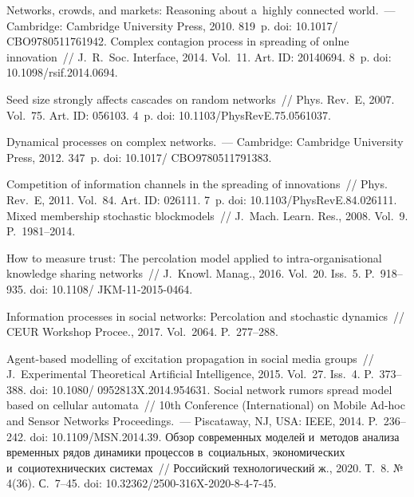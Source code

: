 \begin{multicols}{2}
{\small\frenchspacing
{%
\begin{thebibliography}{99}
 Networks, crowds, and markets: Reasoning about a~highly connected 
world.~--- Cambridge: Cambridge University Press, 2010. 819~p. 
doi:  10.1017/ CBO9780511761942.
 Complex contagion process in spreading of 
onlne innovation~// J.~R.~Soc. Interface, 2014. Vol.~11. Art. ID: 20140694. 8~p. doi: 
10.1098/rsif.2014.0694.

 Seed size strongly affects cascades on random networks~// 
Phys. Rev.~E, 2007. Vol.~75. Art. ID: 056103. 4~p. doi: 10.1103/PhysRevE.75.0561037.

 Dynamical processes on complex networks.~--- 
Cambridge: Cambridge University Press, 2012. 347~p. doi: 10.1017/ CBO9780511791383.

 Competition of information channels in the spreading of innovations~// 
Phys. Rev.~E, 2011. Vol.~84. Art. ID: 026111. 7~p. doi: 10.1103/PhysRevE.84.026111.
 Mixed membership stochastic 
blockmodels~// J.~Mach. Learn. Res., 2008. Vol.~9. P.~1981--2014.


 How to measure trust: The percolation model 
applied to intra-organisational knowledge sharing networks~// J.~Knowl. Manag., 2016. Vol.~20. 
Iss.~5. P.~918--935. doi: 10.1108/ JKM-11-2015-0464.

 Information processes in social networks: 
Percolation and stochastic dynamics~// CEUR Workshop Procee., 2017. Vol.~2064. 
P.~277--288.

 Agent-based modelling of excitation propagation in social 
media groups~// J.~Experimental Theoretical Artificial Intelligence, 2015. Vol.~27. Iss.~4.  
P.~373--388. doi: 10.1080/ 0952813X.2014.954631.
 Social network rumors spread model based on cellular automata~// 
10th Conference (International) on Mobile Ad-hoc and Sensor Networks Proceedings.~--- 
Piscataway, NJ, USA: IEEE, 2014. P.~236--242. doi: 10.1109/MSN.2014.39.
Обзор современных моделей и~методов анализа временных рядов динамики процессов 
в~социальных, экономических и~социотехнических системах~//
Российский технологический ж., 2020.
  Т.~8. №\,4(36).  С.~7--45. doi: 
10.32362/2500-316X-2020-8-4-7-45.


\end{thebibliography}}}
\end{multicols}
